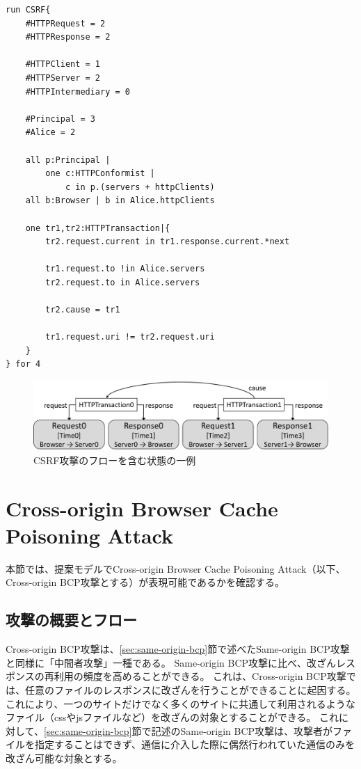 \documentclass[12pt,a4paper]{jbook}
\begin{document}
\begin{lstlisting}[caption=CSRF攻撃の表現, label=code:CSRF]
run CSRF{
	#HTTPRequest = 2
	#HTTPResponse = 2

	#HTTPClient = 1
	#HTTPServer = 2
	#HTTPIntermediary = 0

	#Principal = 3
	#Alice = 2

	all p:Principal |
		one c:HTTPConformist |
			c in p.(servers + httpClients)
	all b:Browser | b in Alice.httpClients

	one tr1,tr2:HTTPTransaction|{
		tr2.request.current in tr1.response.current.*next

		tr1.request.to !in Alice.servers
		tr2.request.to in Alice.servers

		tr2.cause = tr1

		tr1.request.uri != tr2.request.uri
	}
} for 4
\end{lstlisting}

\begin{figure}[htb]
\centering
\includegraphics[width=450pt]{./fig/CSRF_alloy.eps}
\caption{CSRF攻撃のフローを含む状態の一例}
\label{fig:CSRF_alloy}
\end{figure}

\section{Cross-origin Browser Cache Poisoning Attack}
本節では、提案モデルでCross-origin Browser Cache Poisoning Attack\cite{bcpattack}（以下、Cross-origin BCP攻撃とする）が表現可能であるかを確認する。

\subsection{攻撃の概要とフロー}
Cross-origin BCP攻撃は、\ref{sec:same-origin-bcp}節で述べたSame-origin BCP攻撃と同様に「中間者攻撃」一種である。
Same-origin BCP攻撃に比べ、改ざんレスポンスの再利用の頻度を高めることができる。
これは、Cross-origin BCP攻撃では、任意のファイルのレスポンスに改ざんを行うことができることに起因する。
これにより、一つのサイトだけでなく多くのサイトに共通して利用されるようなファイル（cssやjsファイルなど）を改ざんの対象とすることができる。
これに対して、\ref{sec:same-origin-bcp}節で記述のSame-origin BCP攻撃は、攻撃者がファイルを指定することはできず、通信に介入した際に偶然行われていた通信のみを改ざん可能な対象とする。
\end{document}
